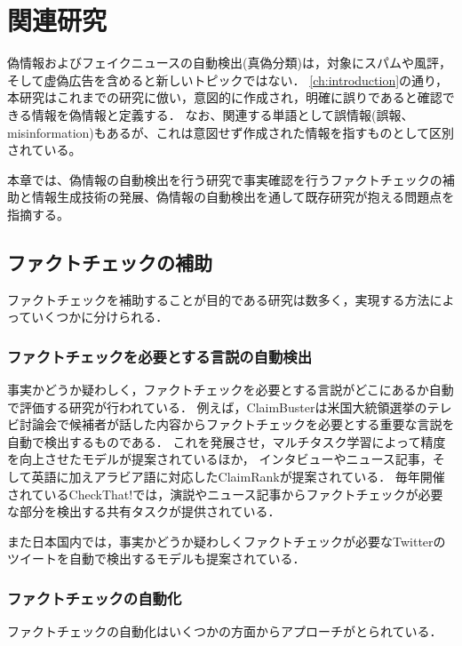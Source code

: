 \chapter{関連研究}\label{ch:rel_res}

偽情報およびフェイクニュースの自動検出(真偽分類)は，対象にスパム\cite{shen2017discovering}や風評\cite{7023340}，そして虚偽広告\cite{Huang:2017:DFO:3041021.3054233}を含めると新しいトピックではない．
\cref{ch:introduction}の通り，本研究はこれまでの研究\cite{Born2017-11-02,Shu:2017:FND:3137597.3137600,Ruchansky:2017:CHD:3132847.3132877,Wang:2018:EEA:3219819.3219903}に倣い，意図的に作成され，明確に誤りであると確認できる情報を偽情報と定義する．
なお、関連する単語として誤情報(誤報、misinformation)もあるが、これは意図せず作成された情報を指すものとして区別されている\cite{Born2017-11-02}。

本章では、偽情報の自動検出を行う研究で事実確認を行うファクトチェックの補助と情報生成技術の発展、偽情報の自動検出を通して既存研究が抱える問題点を指摘する。


\section{ファクトチェックの補助}
ファクトチェックを補助することが目的である研究は数多く，実現する方法によっていくつかに分けられる．

\subsection{ファクトチェックを必要とする言説の自動検出}
事実かどうか疑わしく，ファクトチェックを必要とする言説がどこにあるか自動で評価する研究が行われている．
例えば，ClaimBusterは米国大統領選挙のテレビ討論会で候補者が話した内容からファクトチェックを必要とする重要な言説を自動で検出するものである\cite{10.1145/2806416.2806652}．
これを発展させ，マルチタスク学習によって精度を向上させたモデル\cite{vasileva-etal-2019-takes}が提案されているほか，
インタビューやニュース記事，そして英語に加えアラビア語に対応したClaimRank\cite{jaradat-etal-2018-claimrank}が提案されている．
毎年開催されているCheckThat!では，演説やニュース記事からファクトチェックが必要な部分を検出する共有タスクが提供されている\cite{10.1007/978-3-030-45442-5_65}．

また日本国内では，事実かどうか疑わしくファクトチェックが必要なTwitterのツイートを自動で検出するモデルも提案されている\cite{内山香2018}．

\subsection{ファクトチェックの自動化}
ファクトチェックの自動化はいくつかの方面からアプローチがとられている．

